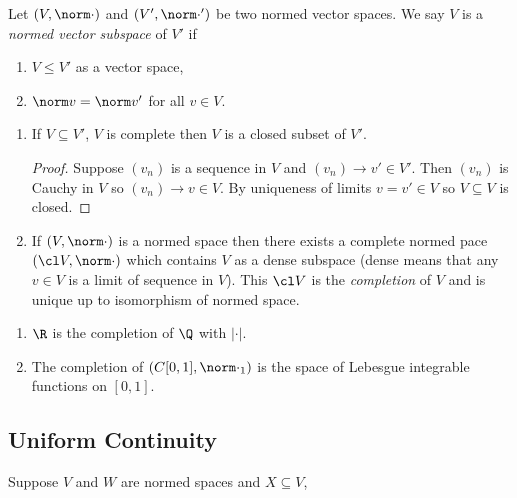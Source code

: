 \documentclass[a4paper]{article}
\theoremstyle{definition}
\begin{document}
\begin{definition}
  Let \((V, \norm \cdot)\) and \((V', \norm \cdot')\) be two normed vector spaces. We say \(V\) is a \emph{normed vector subspace} of \(V'\) if
  \begin{enumerate}
  \item \(V \leq V'\) as a vector space,
  \item \(\norm v = \norm v'\) for all \(v \in V\).
  \end{enumerate}

\end{definition}

\begin{remark}\leavevmode
  \begin{enumerate}
  \item If \(V \subseteq V'\), \(V\) is complete then \(V\) is a closed subset of \(V'\).
    \begin{proof}
      Suppose \((v_n)\) is a sequence in \(V\) and \((v_n) \to v' \in V'\). Then \((v_n)\) is Cauchy in \(V\) so \((v_n) \to v \in V\). By uniqueness of limits \(v = v' \in V\) so \(V \subseteq V\) is closed.
    \end{proof}
  \item If \((V, \norm \cdot)\) is a normed space then there exists a complete normed pace \((\cl V, \norm \cdot)\) which contains \(V\) as a dense subspace (dense means that any \(v \in V\) is a limit of sequence in \(V\)). This \(\cl V\) is the \emph{completion} of \(V\) and is unique up to isomorphism of normed space.
  \end{enumerate}
\end{remark}

\begin{eg}\leavevmode
  \begin{enumerate}
  \item \(\R\) is the completion of \(\Q\) with \(|\cdot|\).
  \item The completion of \((C[0, 1], \norm \cdot_1)\) is the space of Lebesgue integrable functions on \([0, 1]\).
    \end{enumerate}
\end{eg}

\subsection{Uniform Continuity}

Suppose \(V\) and \(W\) are normed spaces and \(X \subseteq V\),
\end{document}
